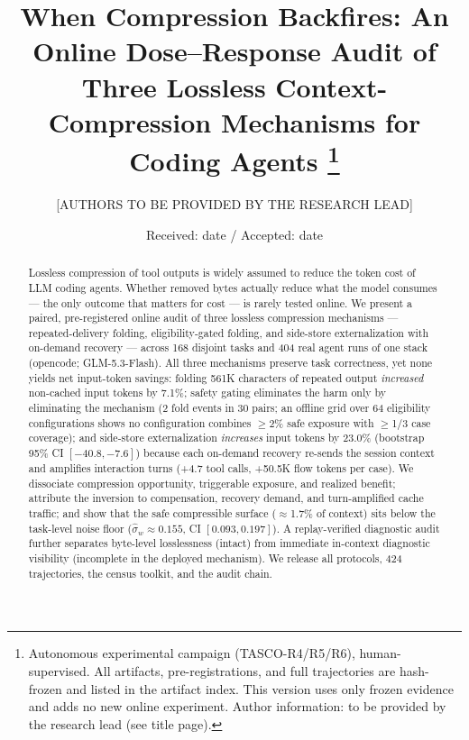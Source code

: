 \documentclass[twocolumn]{svjour3}       %
\begin{document}
\title{When Compression Backfires: An Online Dose--Response Audit of Three
Lossless Context-Compression Mechanisms for Coding Agents%
\thanks{Autonomous experimental campaign (TASCO-R4/R5/R6), human-supervised. All
artifacts, pre-registrations, and full trajectories are hash-frozen and listed in the
artifact index. This version uses only frozen evidence and adds no new online
experiment. Author information: to be provided by the research lead (see title page).}
}

\author{[AUTHORS TO BE PROVIDED BY THE RESEARCH LEAD]}

\date{Received: date / Accepted: date}

\maketitle

\begin{abstract}
Lossless compression of tool outputs is widely assumed to reduce the token cost of LLM
coding agents. Whether removed bytes actually reduce what the model consumes --- the
only outcome that matters for cost --- is rarely tested online. We present a paired,
pre-registered online audit of three lossless compression mechanisms --- repeated-delivery
folding, eligibility-gated folding, and side-store externalization with on-demand
recovery --- across 168 disjoint tasks and 404 real agent runs of one stack (opencode;
GLM-5.3-Flash). All three mechanisms preserve task correctness, yet none yields net
input-token savings: folding 561K characters of repeated output \emph{increased}
non-cached input tokens by 7.1\%; safety gating eliminates the harm only by eliminating
the mechanism (2 fold events in 30 pairs; an offline grid over 64 eligibility
configurations shows no configuration combines $\geq$2\% safe exposure with $\geq$1/3
case coverage); and side-store externalization \emph{increases} input tokens by 23.0\%
(bootstrap 95\% CI $[-40.8, -7.6]$) because each on-demand recovery re-sends the session
context and amplifies interaction turns (+4.7 tool calls, +50.5K flow tokens per case).
We dissociate compression opportunity, triggerable exposure, and realized benefit;
attribute the inversion to compensation, recovery demand, and turn-amplified cache
traffic; and show that the safe compressible surface ($\approx$1.7\% of context) sits
below the task-level noise floor ($\hat\sigma_w \approx 0.155$, CI $[0.093, 0.197]$). A
replay-verified diagnostic audit further separates byte-level losslessness (intact) from
immediate in-context diagnostic visibility (incomplete in the deployed mechanism). We
release all protocols, 424 trajectories, the census toolkit, and the audit chain.
\end{abstract}
\end{document}
